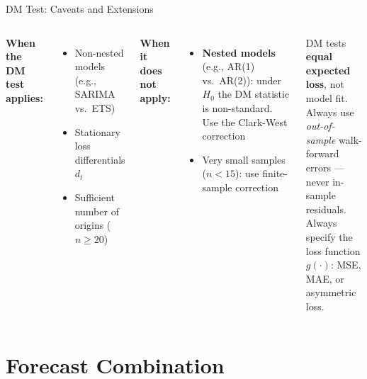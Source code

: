 \documentclass[aspectratio=169, 11pt]{beamer}
\begin{document}
\begin{frame}{DM Test: Caveats and Extensions}
  \begin{columns}[T]
      \textbf{When the DM test applies:}
      \begin{itemize}\small
        \item Non-nested models (e.g., SARIMA vs.\ ETS)
        \item Stationary loss differentials $d_t$
        \item Sufficient number of origins ($n \geq 20$)
      \end{itemize}
      \vspace{0.1cm}
      \textbf{When it does not apply:}
      \begin{itemize}\small
        \item \textbf{Nested models} (e.g., AR(1) vs.\ AR(2)):
              under $H_0$ the DM statistic is non-standard.
              Use the Clark-West correction \parencite{Clark2007}
        \item Very small samples ($n < 15$): use finite-sample
              correction \parencite{Harvey1997}
      \end{itemize}
      \begin{keybox}
        {\small DM tests \textbf{equal expected loss}, not model fit.\\[3pt]
        Always use \emph{out-of-sample} walk-forward errors ---
        never in-sample residuals.\\[3pt]
        Always specify the loss function $g(\cdot)$: MSE, MAE,
        or asymmetric loss.}
      \end{keybox}
  \end{columns}
\end{frame}

\section{Forecast Combination}

\end{document}
